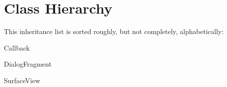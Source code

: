 \section{Class Hierarchy}
This inheritance list is sorted roughly, but not completely, alphabetically\+:\begin{DoxyCompactList}
\item Callback\begin{DoxyCompactList}
\item {}
\end{DoxyCompactList}
\item {}
\item Dialog\+Fragment\begin{DoxyCompactList}
\item {}
\end{DoxyCompactList}
\item Surface\+View\begin{DoxyCompactList}
\item {}
\end{DoxyCompactList}
\end{DoxyCompactList}
